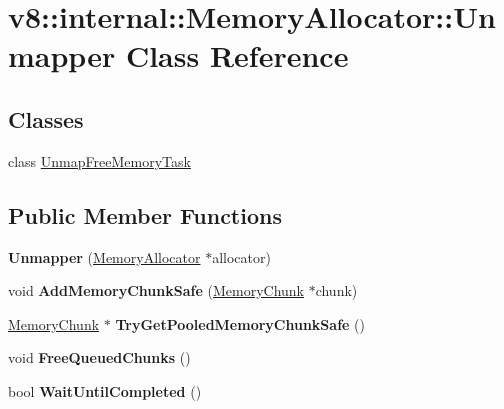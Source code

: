 \hypertarget{classv8_1_1internal_1_1_memory_allocator_1_1_unmapper}{}\section{v8\+:\+:internal\+:\+:Memory\+Allocator\+:\+:Unmapper Class Reference}
\label{classv8_1_1internal_1_1_memory_allocator_1_1_unmapper}
\subsection*{Classes}
\begin{DoxyCompactItemize}
\item 
class \hyperlink{classv8_1_1internal_1_1_memory_allocator_1_1_unmapper_1_1_unmap_free_memory_task}{Unmap\+Free\+Memory\+Task}
\end{DoxyCompactItemize}
\subsection*{Public Member Functions}
\begin{DoxyCompactItemize}
\item 
{\bfseries Unmapper} (\hyperlink{classv8_1_1internal_1_1_memory_allocator}{Memory\+Allocator} $\ast$allocator)\hypertarget{classv8_1_1internal_1_1_memory_allocator_1_1_unmapper_ad0174f91b708b5922dd06a391b4f0019}{}\label{classv8_1_1internal_1_1_memory_allocator_1_1_unmapper_ad0174f91b708b5922dd06a391b4f0019}

\item 
void {\bfseries Add\+Memory\+Chunk\+Safe} (\hyperlink{classv8_1_1internal_1_1_memory_chunk}{Memory\+Chunk} $\ast$chunk)\hypertarget{classv8_1_1internal_1_1_memory_allocator_1_1_unmapper_a34816240311f3bb73442f93fa7c5a9e8}{}\label{classv8_1_1internal_1_1_memory_allocator_1_1_unmapper_a34816240311f3bb73442f93fa7c5a9e8}

\item 
\hyperlink{classv8_1_1internal_1_1_memory_chunk}{Memory\+Chunk} $\ast$ {\bfseries Try\+Get\+Pooled\+Memory\+Chunk\+Safe} ()\hypertarget{classv8_1_1internal_1_1_memory_allocator_1_1_unmapper_ace6bf46ce96af9e77a659dfc847d3586}{}\label{classv8_1_1internal_1_1_memory_allocator_1_1_unmapper_ace6bf46ce96af9e77a659dfc847d3586}

\item 
void {\bfseries Free\+Queued\+Chunks} ()\hypertarget{classv8_1_1internal_1_1_memory_allocator_1_1_unmapper_a9e6f9f9744299110bb5db0eef459f76a}{}\label{classv8_1_1internal_1_1_memory_allocator_1_1_unmapper_a9e6f9f9744299110bb5db0eef459f76a}

\item 
bool {\bfseries Wait\+Until\+Completed} ()\hypertarget{classv8_1_1internal_1_1_memory_allocator_1_1_unmapper_a592895ad78a3db81c53ac534bb9842b3}{}\label{classv8_1_1internal_1_1_memory_allocator_1_1_unmapper_a592895ad78a3db81c53ac534bb9842b3}

\end{DoxyCompactItemize}
